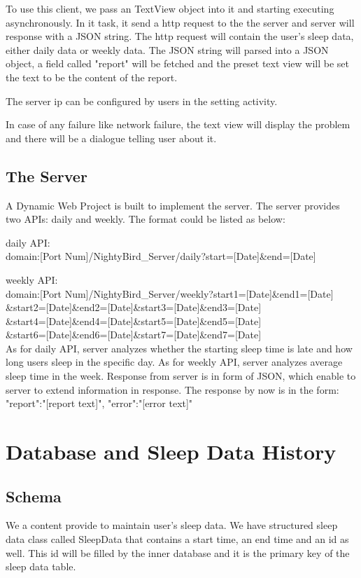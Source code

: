 \documentclass[14pt]{extreport}
\begin{document}
To use this client, we pass an TextView object into it and starting executing asynchronously. In it task, it send a http request to the the server and server will response with a JSON string.  The http request will contain the user's sleep data, either daily data or weekly data. The JSON string will parsed into a JSON object, a field called "report" will be fetched and the preset text view will be set the text to be the content of the report.

The server ip can be configured by users in the setting activity.

In case of any failure like network failure, the text view will display the problem and there will be a dialogue telling user about it.

\section{The Server}
A Dynamic Web Project is built to implement the server.  The server provides two APIs: daily and weekly. The format could be listed as below:

daily  API:\\
domain:[Port Num]/NightyBird\_Server/daily?start=[Date]\&end=[Date]

weekly API:\\
domain:[Port Num]/NightyBird\_Server/weekly?start1=[Date]\&end1=[Date]\\
\&start2=[Date]\&end2=[Date]\&start3=[Date]\&end3=[Date]\\
\&start4=[Date]\&end4=[Date]\&start5=[Date]\&end5=[Date]\\
\&start6=[Date]\&end6=[Date]\&start7=[Date]\&end7=[Date]\\

As for daily API, server analyzes whether the starting sleep time is late and how long users sleep in the specific day. As for weekly API, server analyzes average sleep time in the week. Response from server is in form of JSON, which enable to server to extend information in response. The response by now is in the form:
{"report":"[report text]", "error":"[error text]"}



\chapter{Database and Sleep Data History}

\section{Schema}
We a content provide to maintain user's sleep data. We have structured sleep data class called SleepData that contains a start time, an end time and an id as well. This id will be filled by the inner database and it is the primary key of the sleep data table.
\end{document}
